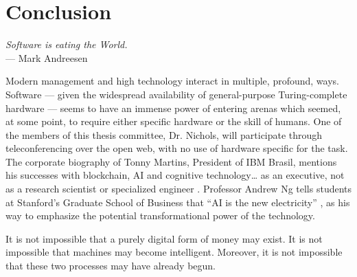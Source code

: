 \chapter{Conclusion}
\bigskip

\begin{flushright}{\slshape
	Software is eating the World.} \\ \medskip
    --- Mark Andreesen \citep{andreesen:2011}
\end{flushright}
\bigskip
\bigskip

\noindent Modern management and high technology interact in multiple, profound, ways.  Software --- given the widespread availability of general-purpose Turing-complete hardware --- seems to have an immense power of entering arenas which seemed, at some point, to require either specific hardware or the skill of humans.  One of the members of this thesis committee, Dr. Nichols, will participate through teleconferencing over the open web, with no use of hardware specific for the task.  The corporate biography of Tonny Martins, President of IBM Brasil, mentions his successes with blockchain, AI and cognitive technology… as an executive, not as a research scientist or specialized engineer \citep{TonnyMartins}. Professor Andrew Ng tells students at Stanford’s Graduate School of Business that ``AI is the new electricity'' \citep{AndrewNgAI}, as his way to emphasize the potential transformational power of the technology.

It is not impossible that a purely digital form of money may exist.  It is not impossible that machines may become intelligent.  Moreover, it is not impossible that these two processes may have already begun.

